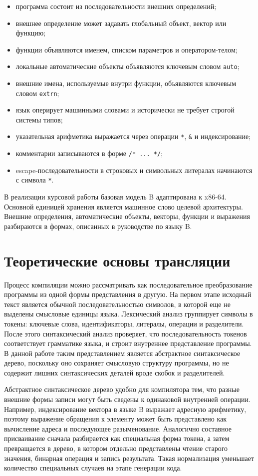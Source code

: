 \begin{itemize}
  \item программа состоит из последовательности внешних определений;
  \item внешнее определение может задавать глобальный объект, вектор или функцию;
  \item функции объявляются именем, списком параметров и оператором-телом;
  \item локальные автоматические объекты объявляются ключевым словом \texttt{auto};
  \item внешние имена, используемые внутри функции, объявляются ключевым словом \texttt{extrn};
  \item язык оперирует машинными словами и исторически не требует строгой системы типов;
  \item указательная арифметика выражается через операции \texttt{*}, \texttt{\&} и индексирование;
  \item комментарии записываются в форме \texttt{/* ... */};
  \item escape-последовательности в строковых и символьных литералах начинаются с символа \texttt{*}.
\end{itemize}

В реализации курсовой работы базовая модель B адаптирована к x86-64. Основной единицей хранения является машинное слово целевой архитектуры. Внешние определения, автоматические объекты, векторы, функции и выражения разбираются в формах, описанных в руководстве по языку B.

\section{Теоретические основы трансляции}

Процесс компиляции можно рассматривать как последовательное преобразование программы из одной формы представления в другую. На первом этапе исходный текст является обычной последовательностью символов, в которой еще не выделены смысловые единицы языка. Лексический анализ группирует символы в токены: ключевые слова, идентификаторы, литералы, операции и разделители. После этого синтаксический анализ проверяет, что последовательность токенов соответствует грамматике языка, и строит внутреннее представление программы. В данной работе таким представлением является абстрактное синтаксическое дерево, поскольку оно сохраняет смысловую структуру программы, но не содержит лишних синтаксических деталей вроде скобок и разделителей.

Абстрактное синтаксическое дерево удобно для компилятора тем, что разные внешние формы записи могут быть сведены к одинаковой внутренней операции. Например, индексирование вектора в языке B выражает адресную арифметику, поэтому выражение обращения к элементу может быть представлено как вычисление адреса и последующее разыменование. Аналогично составное присваивание сначала разбирается как специальная форма токена, а затем превращается в дерево, в котором отдельно представлены чтение старого значения, бинарная операция и запись результата. Такая нормализация уменьшает количество специальных случаев на этапе генерации кода.

